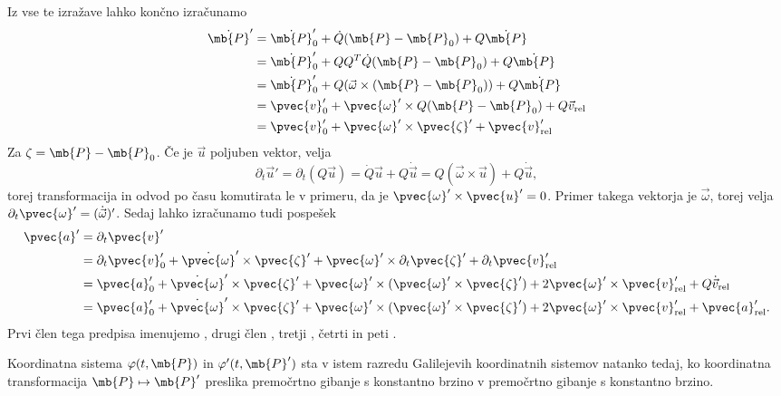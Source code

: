 Iz vse te izražave lahko končno izračunamo
\begin{align*}
  \dot{\mb{P}}'
  &= \dot{\mb{P}}_0' + \dot{Q} (\mb{P} - \mb{P}_0) + Q \dot{\mb{P}} \\
  &= \dot{\mb{P}}_0' + Q Q^T \dot{Q} (\mb{P} - \mb{P}_0) + Q \dot{\mb{P}} \\
  &= \dot{\mb{P}}_0' + Q (\vec{\omega} \times (\mb{P} - \mb{P}_0)) + Q \dot{\mb{P}} \\
  &= \pvec{v}_0' + \pvec{\omega}' \times Q(\mb{P} - \mb{P}_0) + Q \vec{v}_{\text{rel}} \\
  &= \pvec{v}_0' + \pvec{\omega}' \times \pvec{\zeta}' + \pvec{v}'_{\text{rel}}
\end{align*}
Za $\zeta = \mb{P} - \mb{P}_0$.
Če je $\vec{u}$ poljuben vektor, velja
\[
  \partial_t \vec{u}'
  = \partial_t (Q \vec{u})
  = \dot{Q} \vec{u} + Q \dot{\vec{u}}
  = Q(\vec{\omega} \times \vec{u}) + Q \dot{\vec{u}},
\]
torej transformacija in odvod po času komutirata le v primeru, da je
$\pvec{\omega}' \times \pvec{u}' = 0$.
Primer takega vektorja je $\vec{\omega}$, torej velja $\partial_t \pvec{\omega}'
= (\dot{\vec{\omega}})'$.
Sedaj lahko izračunamo tudi pospešek
\begin{align*}
  \pvec{a}'
  &= \partial_t \pvec{v}' \\
  &= \partial_t \pvec{v}_0'
	+ \dot{\pvec{\omega}}' \times \pvec{\zeta}'
	+ \pvec{\omega}' \times \partial_t \pvec{\zeta}'
	+ \partial_t \pvec{v}_{\text{rel}}' \\
  &= \pvec{a}_0'
	+ \dot{\pvec{\omega}}' \times \pvec{\zeta}'
	+ \pvec{\omega}' \times (\pvec{\omega}' \times \pvec{\zeta}')
	+ 2 \pvec{\omega}' \times \pvec{v}_{\text{rel}}'
	+ Q \dot{\vec{v}}_{\text{rel}} \\
  &= \pvec{a}_0'
	+ \dot{\pvec{\omega}}' \times \pvec{\zeta}'
	+ \pvec{\omega}' \times (\pvec{\omega}' \times \pvec{\zeta}')
	+ 2 \pvec{\omega}' \times \pvec{v}_{\text{rel}}'
	+ \pvec{a}_{\text{rel}}'. \\
\end{align*}
Prvi člen tega predpisa imenujemo , drugi člen
, tretji , četrti
 in peti .


\begin{izrek}
  Koordinatna sistema $\varphi(t, \mb{P})$ in $\varphi'(t, \mb{P}')$ sta v istem
  razredu Galilejevih koordinatnih sistemov natanko tedaj, ko koordinatna
  transformacija $\mb{P} \mapsto \mb{P}'$ preslika premočrtno gibanje s
  konstantno brzino v premočrtno gibanje s konstantno brzino.
\end{izrek}

